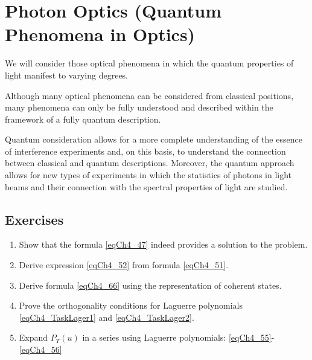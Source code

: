 \chapter{Photon Optics (Quantum Phenomena in Optics)}
\label{chOptic}
We will consider those optical phenomena in which the quantum properties of light manifest to varying degrees.

Although many optical phenomena can be considered from classical positions, many phenomena can only be fully understood and described within the framework of a fully quantum description.

Quantum consideration allows for a more complete understanding of the essence of interference experiments and, on this basis, to understand the connection between classical and quantum descriptions. Moreover, the quantum approach allows for new types of experiments in which the statistics of photons in light beams and their connection with the spectral properties of light are studied.












\section{Exercises}
\begin{enumerate}
\item Show that the formula \eqref{eqCh4_47} indeed provides a solution to the problem.
\item Derive expression \eqref{eqCh4_52} from formula \eqref{eqCh4_51}.
\item Derive formula \eqref{eqCh4_66} using the representation of coherent states.
\item Prove the orthogonality conditions for Laguerre polynomials \eqref{eqCh4_TaskLager1} and \eqref{eqCh4_TaskLager2}.
\item Expand $P_T\left(u\right)$ in a series using Laguerre polynomials: \eqref{eqCh4_55}-\eqref{eqCh4_56}
\end{enumerate}

